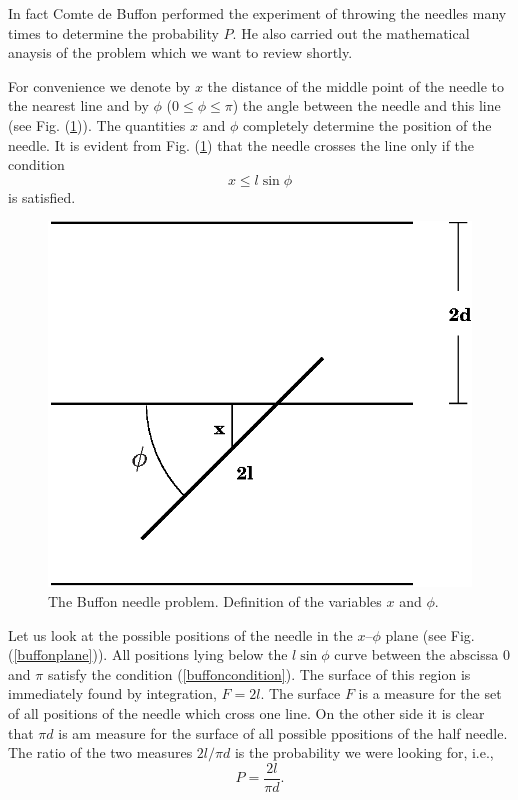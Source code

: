 In fact Comte de Buffon performed the experiment of throwing the
needles many times to determine the probability $P$. He also carried
out the mathematical anaysis of the problem which we want to review
shortly.

For convenience we denote by $x$ the distance of the middle point of
the needle to the nearest line and by $\phi$ ($0 \le \phi \le \pi$) the
angle between the needle and this line (see
Fig. (\ref{buffondefinition})). The quantities $x$ and $\phi$
completely determine the position of the needle. It is evident from
Fig. (\ref{buffondefinition}) that the needle crosses the line only if
the condition
\begin{equation}
\label{buffoncondition}
x \le l \sin \phi
\end{equation}
is satisfied.


\begin{figure}
\label{buffondefinition}
\includegraphics{Figures/buffondefinition.eps}
\caption{The Buffon needle problem. Definition of the variables $x$
  and $\phi$.}
\end{figure}

Let us look at the possible positions of the needle in the $x$--$\phi$
plane (see Fig. (\ref{buffonplane})). All positions lying below the
$l\sin \phi$ curve between the abscissa 0 and $\pi$ satisfy the
condition (\ref{buffoncondition}). The surface of this region is
immediately found by integration, $F=2l$. The surface $F$ is a measure
for the set of all positions of the needle which cross one line. On
the other side it is clear that $\pi d$ is am measure for the surface
of all possible ppositions of the half needle. The ratio of the two
measures $ 2l/\pi d$ is the probability we were looking for, i.e.,
\begin{equation}
\label{buffonprobability}
P = \frac{2 l}{\pi d}.
\end{equation}

